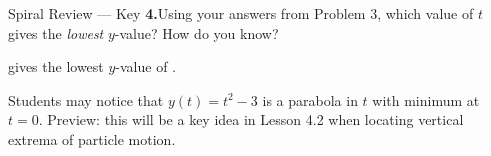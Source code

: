 \documentclass[10pt]{article}
\begin{document}
\begin{notesbox}{Spiral Review --- Key}
\vspace{0.14in}
\textbf{4.}\quad Using your answers from Problem 3, which value of $t$
gives the \emph{lowest} $y$-value? How do you know?

\vspace{4pt}
 gives the lowest $y$-value of . 

\begin{teachernote}
  Students may notice that $y(t) = t^2 - 3$ is a parabola in $t$ with
  minimum at $t = 0$. Preview: this will be a key idea in Lesson 4.2
  when locating vertical extrema of particle motion.
\end{teachernote}

\end{notesbox}
\end{document}
